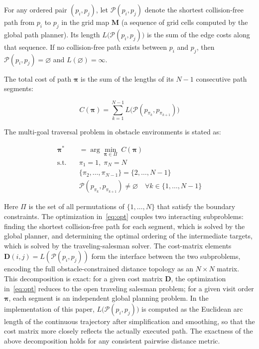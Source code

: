 \documentclass[pdflatex,sn-basic,Numbered]{sn-jnl}
\begin{document}
For any ordered pair $(p_i, p_j)$, let $\mathcal{P}(p_i, p_j)$ denote the shortest collision-free path from $p_i$ to $p_j$ in the grid map $\mathbf{M}$ (a sequence of grid cells computed by the global path planner). Its length $L\big(\mathcal{P}(p_i, p_j)\big)$ is the sum of the edge costs along that sequence. If no collision-free path exists between $p_i$ and $p_j$, then $\mathcal{P}(p_i, p_j) = \varnothing$ and $L(\varnothing) = \infty$.

The total cost of path $\bm{\pi}$ is the sum of the lengths of its $N-1$ consecutive path segments:

\begin{equation}
C(\bm{\pi}) = \sum_{k=1}^{N-1} L\big(\mathcal{P}(p_{\pi_k}, p_{\pi_{k+1}})\big)
\label{eq:totalcost}
\end{equation}

The multi-goal traversal problem in obstacle environments is stated as:

\begin{align}
\bm{\pi}^{*} &= \arg\min_{\bm{\pi} \in \Pi} \; C(\bm{\pi})
\label{eq:opt}\\
\text{s.t.} \quad &\pi_1 = 1,\; \pi_N = N \nonumber\\
&\{\pi_2, \dots, \pi_{N-1}\} = \{2, \dots, N-1\} \nonumber\\
&\mathcal{P}(p_{\pi_k}, p_{\pi_{k+1}}) \neq \varnothing \quad \forall k \in \{1, \dots, N-1\} \nonumber
\end{align}

Here $\Pi$ is the set of all permutations of $\{1, \dots, N\}$ that satisfy the boundary constraints. The optimization in~\eqref{eq:opt} couples two interacting subproblems: finding the shortest collision-free path for each segment, which is solved by the global planner, and determining the optimal ordering of the intermediate targets, which is solved by the traveling-salesman solver. The cost-matrix elements $\mathbf{D}(i, j) = L(\mathcal{P}(p_i, p_j))$ form the interface between the two subproblems, encoding the full obstacle-constrained distance topology as an $N \times N$ matrix. This decomposition is exact: for a given cost matrix $\mathbf{D}$, the optimization in~\eqref{eq:opt} reduces to the open traveling salesman problem; for a given visit order $\bm{\pi}$, each segment is an independent global planning problem. In the implementation of this paper, $L\big(\mathcal{P}(p_i, p_j)\big)$ is computed as the Euclidean arc length of the continuous trajectory after simplification and smoothing, so that the cost matrix more closely reflects the actually executed path. The exactness of the above decomposition holds for any consistent pairwise distance metric.
\end{document}
